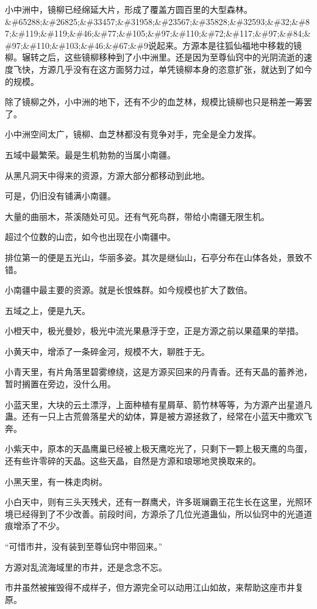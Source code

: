 \begin{this_body}
小中洲中，镜柳已经绵延大片，形成了覆盖方圆百里的大型森林。\&\#65288;\&\#26825;\&\#33457;\&\#31958;\&\#23567;\&\#35828;\&\#32593;\&\#32;\&\#87;\&\#119;\&\#119;\&\#46;\&\#77;\&\#105;\&\#97;\&\#110;\&\#72;\&\#117;\&\#97;\&\#84;\&\#97;\&\#110;\&\#103;\&\#46;\&\#67;\&\#9说起来。方源本是往狐仙福地中移栽的镜柳。辗转之后，这些镜柳移种到了小中洲里。还是因为至尊仙窍中的光阴流逝的速度飞快，方源几乎没有在这方面努力过，单凭镜柳本身的恣意扩张，就达到了如今的规模。

除了镜柳之外，小中洲的地下，还有不少的血芝林，规模比镜柳也只是稍差一筹罢了。

小中洲空间太广，镜柳、血芝林都没有竞争对手，完全是全力发挥。

五域中最繁荣。最是生机勃勃的当属小南疆。

从黑凡洞天中得来的资源，方源大部分都移动到此地。

可是，仍旧没有铺满小南疆。

大量的曲丽木，茶溪随处可见。还有气死鸟群，带给小南疆无限生机。

超过个位数的山峦，如今也出现在小南疆中。

排位第一的便是五光山，华丽多姿。其次是继仙山，石亭分布在山体各处，景致不错。

小南疆中最主要的资源。就是长恨蛛群。如今规模也扩大了数倍。

五域之上，便是九天。

小橙天中，极光曼妙，极光中流光果悬浮于空，正是方源之前以果蕴果的举措。

小黄天中，增添了一条碎金河，规模不大，聊胜于无。

小青天里，有片角落里碧雾缭绕，这是方源买回来的丹青香。还有天晶的蓄养池，暂时搁置在旁边，没什么用。

小蓝天里，大块的云土漂浮，上面种植有星屑草、箭竹林等等，为方源产出星道凡蛊。还有一只上古荒兽落星犬的幼体，算是被方源拯救了，经常在小蓝天中撒欢飞奔。

小紫天中，原本的天晶鹰巢已经被上极天鹰吃光了，只剩下一颗上极天鹰的鸟蛋，还有些许零碎的天晶。这些天晶，自然是方源和琅琊地灵换取来的。

小黑天里，有一株走肉树。

小白天中，则有三头天残犬，还有一群鹰犬，许多斑斓霸王花生长在这里，光照环境已经得到了不少改善。前段时间，方源杀了几位光道蛊仙，所以仙窍中的光道道痕增添了不少。

“可惜市井，没有装到至尊仙窍中带回来。”

方源对乱流海域里的市井，还是念念不忘。

市井虽然被摧毁得不成样子，但方源完全可以动用江山如故，来帮助这座市井复原。


\end{this_body}
